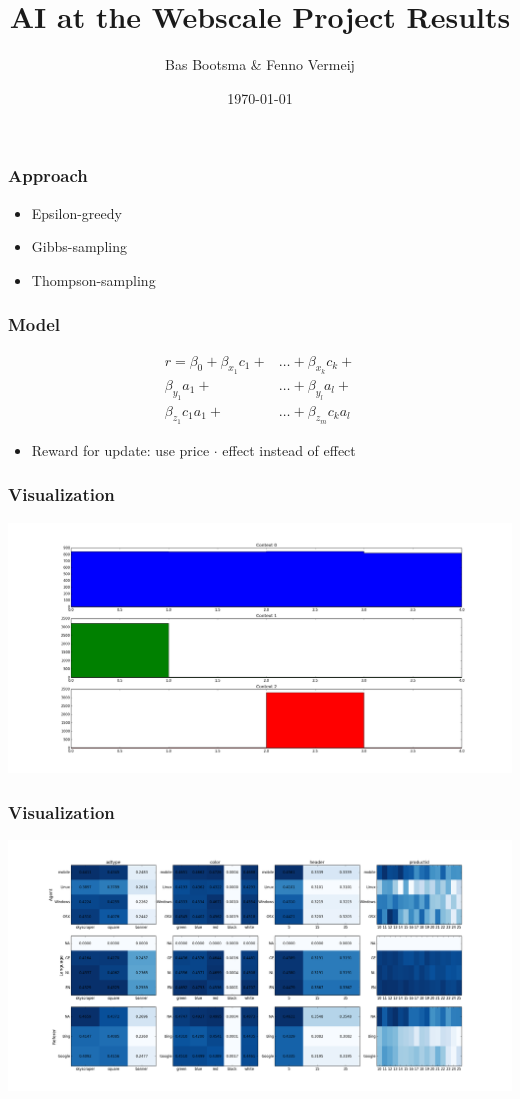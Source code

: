 \documentclass{beamer}
\title[AI@Webscale Presentation]{
  AI at the Webscale Project Results}
\author[Bas Bootsma, Fenno Vermeij]{Bas Bootsma \& Fenno Vermeij}
\institute[Radboud University Nijmegen]{Radboud University Nijmegen}
\date{\today}
\begin{document}
\begin{frame}
  \titlepage
\end{frame}

\begin{frame}
	\frametitle{Approach}	
	\begin{itemize}
		\item Epsilon-greedy
		\item Gibbs-sampling
		\item Thompson-sampling
	\end{itemize}
\end{frame}

\begin{frame}
	\frametitle{Model}
	
		\begin{align*} r = \beta_0 + \beta_{x_1} c_1 + &\ldots + \beta_{x_k} c_k + \\
	    \beta_{y_1} a_1 + &\ldots + \beta_{y_l} a_l + \\
	    \beta_{z_1} c_1a_1 + &\ldots + \beta_{z_m} c_ka_l 
	    \end{align*}
	    \begin{itemize}
		\item Reward for update: use price $\cdot$ effect instead of effect
	\end{itemize}
\end{frame}

\begin{frame}
	\frametitle{Visualization}
	\includegraphics[width=\textwidth]{test.png}
\end{frame}

\begin{frame}
	\frametitle{Visualization}
	\includegraphics[width=\textwidth]{viewer.png}
\end{frame}
\end{document}
